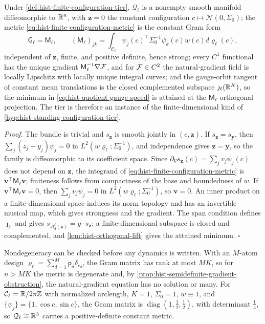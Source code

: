 Under \cref{def:hist-finite-configuration-tier}, \(\mathcal Q_\ell\) is a
nonempty smooth manifold diffeomorphic to \(\mathbb R^n\), with \(\mathbf z=0\) the
constant configuration \(c\mapsto\mathcal N(0,\Sigma_0)\); the metric
\eqref{eq:hist-finite-configuration-metric} is the constant Gram form
\begin{equation}
\mathsf G_\ell=\mathsf M_\ell,
\qquad
(\mathsf M_\ell)_{jk}
=\int_{\mathcal C_\ell}\psi_j(c)^\top\Sigma_0^{-1}\psi_k(c)w(c)
d\varrho_\ell(c),
\label{eq:hist-configuration-gram}
\end{equation}
independent of \(\mathbf z\), finite, and positive definite, hence strong; every
\(C^1\) functional has the unique gradient \(\mathsf M_\ell^{-1}\nabla\mathcal F\),
and for \(\mathcal F\in C^2\) the natural-gradient field is locally Lipschitz with
locally unique integral curves; and the gauge-orbit tangent of constant mean
translations is the closed complemented subspace \(\jmath_\ell(\mathbb R^K)\), so the
minimum in \eqref{eq:hist-quotient-gauge-speed} is attained at the
\(\mathsf M_\ell\)-orthogonal projection. The tier is therefore an instance of
the finite-dimensional kind of \cref{hyp:hist-standing-configuration-tier}.

\noindent\emph{Proof.}
The bundle is trivial and \(s_{\mathbf z}\) is smooth jointly in
\((c,\mathbf z)\). If \(s_{\mathbf z}=s_{\mathbf y}\), then
\(\sum_j(z_j-y_j)\psi_j=0\) in \(L^2(w\varrho_\ell;\Sigma_0^{-1})\), and
independence gives \(\mathbf z=\mathbf y\), so the family is diffeomorphic to
its coefficient space. Since \(\partial_Vs_{\mathbf z}(c)=\sum_jv_j\psi_j(c)\)
does not depend on \(\mathbf z\), the integrand of
\eqref{eq:hist-finite-configuration-metric} is \(\mathbf v^\top\mathsf M_\ell\mathbf v\);
finiteness follows from compactness of the base and boundedness of \(w\).
If \(\mathbf v^\top\mathsf M_\ell\mathbf v=0\), then \(\sum_jv_j\psi_j=0\) in
\(L^2(w\varrho_\ell;\Sigma_0^{-1})\), so \(\mathbf v=0\). An inner product on a
finite-dimensional space induces its norm topology and has an invertible musical
map, which gives strongness and the gradient. The span condition defines
\(\jmath_\ell\) and gives \(s_{\mathscr A^\ell_g(\mathbf z)}=g\cdot s_{\mathbf z}\);
a finite-dimensional subspace is closed and complemented, and
\cref{lem:hist-orthogonal-lift} gives the attained minimum. \(\square\)

Nondegeneracy can be checked before any dynamics is written. With an
\(M\)-atom design \(\varrho_\ell=\sum_{d=1}^M\mathsf p_d\delta_{c_d}\), the Gram
matrix has rank at most \(MK\), so for \(n>MK\) the metric is degenerate and,
by \cref{prop:hist-semidefinite-gradient-obstruction}, the natural-gradient
equation has no solution or many. For \(\mathcal C_\ell=\mathbb R/2\pi\mathbb Z\) with
normalized arclength, \(K=1\), \(\Sigma_0=1\), \(w\equiv1\), and
\(\{\psi_j\}=\{1,\cos c,\sin c\}\), the Gram matrix is
\(\operatorname{diag}(1,\tfrac12,\tfrac12)\), with determinant \(\tfrac14\), so
\(\mathcal Q_\ell\cong\mathbb R^3\) carries a positive-definite constant metric.

